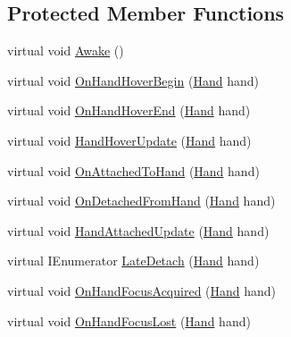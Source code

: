 \subsection*{Protected Member Functions}
\begin{DoxyCompactItemize}
\item 
virtual void \mbox{\hyperlink{class_valve_1_1_v_r_1_1_interaction_system_1_1_throwable_a24abdee13fd616927dbf00d13b9ecd53}{Awake}} ()
\item 
virtual void \mbox{\hyperlink{class_valve_1_1_v_r_1_1_interaction_system_1_1_throwable_a02723daa6d6ea48dc5905231e9b7decf}{On\+Hand\+Hover\+Begin}} (\mbox{\hyperlink{class_valve_1_1_v_r_1_1_interaction_system_1_1_hand}{Hand}} hand)
\item 
virtual void \mbox{\hyperlink{class_valve_1_1_v_r_1_1_interaction_system_1_1_throwable_a7069b2b28bd0b39f12a055b1db2b0f94}{On\+Hand\+Hover\+End}} (\mbox{\hyperlink{class_valve_1_1_v_r_1_1_interaction_system_1_1_hand}{Hand}} hand)
\item 
virtual void \mbox{\hyperlink{class_valve_1_1_v_r_1_1_interaction_system_1_1_throwable_a8a5523917812ed611fe385c195c8e55f}{Hand\+Hover\+Update}} (\mbox{\hyperlink{class_valve_1_1_v_r_1_1_interaction_system_1_1_hand}{Hand}} hand)
\item 
virtual void \mbox{\hyperlink{class_valve_1_1_v_r_1_1_interaction_system_1_1_throwable_a2de42df50ffc477913161053600ede31}{On\+Attached\+To\+Hand}} (\mbox{\hyperlink{class_valve_1_1_v_r_1_1_interaction_system_1_1_hand}{Hand}} hand)
\item 
virtual void \mbox{\hyperlink{class_valve_1_1_v_r_1_1_interaction_system_1_1_throwable_ad868955737538f23428d9123cab46110}{On\+Detached\+From\+Hand}} (\mbox{\hyperlink{class_valve_1_1_v_r_1_1_interaction_system_1_1_hand}{Hand}} hand)
\item 
virtual void \mbox{\hyperlink{class_valve_1_1_v_r_1_1_interaction_system_1_1_throwable_a5171da639ced71a69f5c3fa7934e99ca}{Hand\+Attached\+Update}} (\mbox{\hyperlink{class_valve_1_1_v_r_1_1_interaction_system_1_1_hand}{Hand}} hand)
\item 
virtual I\+Enumerator \mbox{\hyperlink{class_valve_1_1_v_r_1_1_interaction_system_1_1_throwable_a322e3327e63a7ff4de8b16882ecf7d2d}{Late\+Detach}} (\mbox{\hyperlink{class_valve_1_1_v_r_1_1_interaction_system_1_1_hand}{Hand}} hand)
\item 
virtual void \mbox{\hyperlink{class_valve_1_1_v_r_1_1_interaction_system_1_1_throwable_a160dddbe807b3bce6ac27b73dceee3ae}{On\+Hand\+Focus\+Acquired}} (\mbox{\hyperlink{class_valve_1_1_v_r_1_1_interaction_system_1_1_hand}{Hand}} hand)
\item 
virtual void \mbox{\hyperlink{class_valve_1_1_v_r_1_1_interaction_system_1_1_throwable_ae56d0a8f98ee8b8855d1a74817c35fcb}{On\+Hand\+Focus\+Lost}} (\mbox{\hyperlink{class_valve_1_1_v_r_1_1_interaction_system_1_1_hand}{Hand}} hand)
\end{DoxyCompactItemize}
